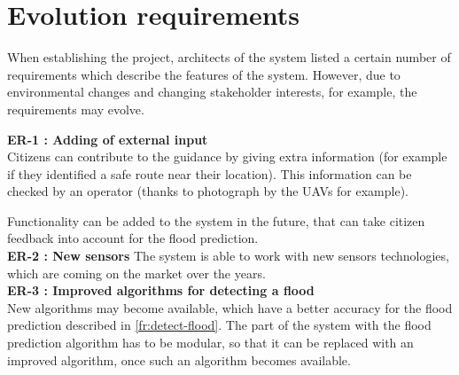 \section{Evolution requirements}
When establishing the project, architects of the system listed a certain number of requirements which describe the features of the system. However, due to environmental changes and changing stakeholder interests, for example, the requirements may evolve.


\textbf{ER-1 : Adding of external input}\\
 Citizens can contribute to the guidance by giving extra information (for example if they identified a safe route near their location). This information can be checked by an operator (thanks to photograph by the UAVs for example). 
 
 Functionality can be added to the system in the future, that can take citizen feedback into account for the flood prediction.
 \\
 
\textbf{ER-2 : New sensors } The system is able to work with new sensors technologies, which are coming on the market over the years. \\

\textbf{ER-3 : Improved algorithms for detecting a flood} \\
New algorithms may become available, which have a better accuracy for the flood prediction described in \ref{fr:detect-flood}. The part of the system with the flood prediction algorithm has to be modular, so that it can be replaced with an improved algorithm, once such an algorithm becomes available.


